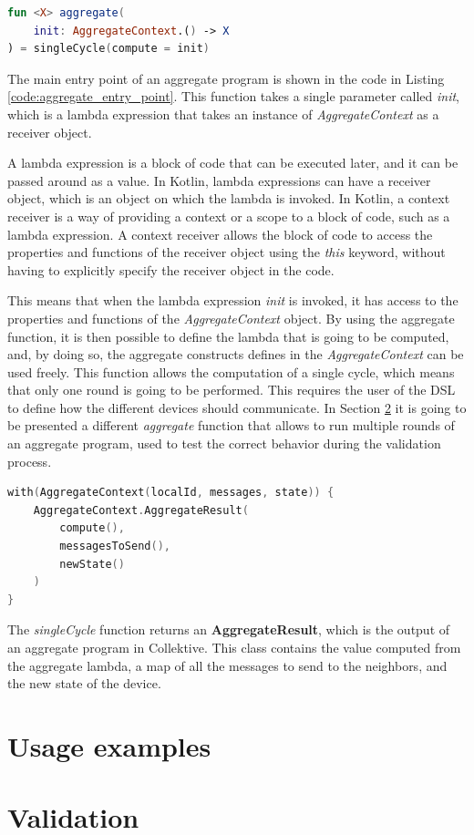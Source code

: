 \begin{lstlisting}[caption={Aggregate entry point}, captionpos=b, language=Kotlin, label={code:aggregate_entry_point}]
fun <X> aggregate(
    init: AggregateContext.() -> X
) = singleCycle(compute = init)
\end{lstlisting}
The main entry point of an aggregate program is shown in the code in Listing \ref{code:aggregate_entry_point}.\newline
This function takes a single parameter called \textit{init}, which is a lambda expression that takes an instance of \textit{AggregateContext} as a receiver object.

\begin{info}
    A lambda expression is a block of code that can be executed later, and it can be passed around as a value. In Kotlin, lambda expressions can have a receiver object, which is an object on which the lambda is invoked.\newline
    In Kotlin, a context receiver is a way of providing a context or a scope to a block of code, such as a lambda expression. A context receiver allows the block of code to access the properties and functions of the receiver object using the \textit{this} keyword, without having to explicitly specify the receiver object in the code.
\end{info}

This means that when the lambda expression \textit{init} is invoked, it has access to the properties and functions of the \textit{AggregateContext} object. By using the aggregate function, it is then possible to define the lambda that is going to be computed, and, by doing so, the aggregate constructs defines in the \textit{AggregateContext} can be used freely.\newline
This function allows the computation of a single cycle, which means that only one round is going to be performed. This requires the user of the DSL to define how the different devices should communicate. In Section \ref{section:validation} it is going to be presented a different \textit{aggregate} function that allows to run multiple rounds of an aggregate program, used to test the correct behavior during the validation process.
\begin{lstlisting}[caption={Single cycle \textit{AggregateResult} output}, captionpos=b, language=Kotlin, label={code:single_cycle_return_type}]
with(AggregateContext(localId, messages, state)) {
    AggregateContext.AggregateResult(
        compute(),
        messagesToSend(),
        newState()
    )
}
\end{lstlisting}
The \textit{singleCycle} function returns an \textbf{AggregateResult}, which is the output of an aggregate program in Collektive. This class contains the value computed from the aggregate lambda, a map of all the messages to send to the neighbors, and the new state of the device.

\section{Usage examples}\label{section:usage_example}

\section{Validation}\label{section:validation}
